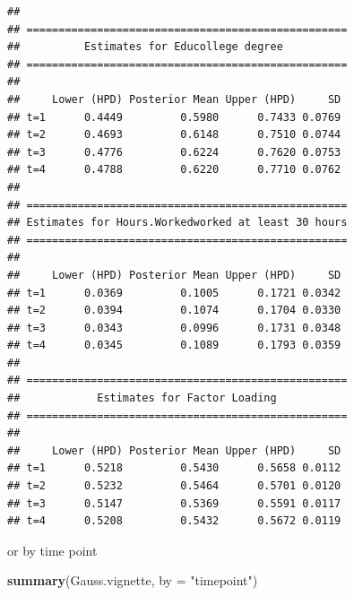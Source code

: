 \documentclass[a4paper, preprint, 3p,
authoryear]{elsarticle} %
\newenvironment{Shaded}{\begin{snugshade}}{\end{snugshade}}
\newcommand{\AttributeTok}[1]{\textcolor[rgb]{0.13,0.29,0.53}{#1}}
\newcommand{\FunctionTok}[1]{\textcolor[rgb]{0.13,0.29,0.53}{\textbf{#1}}}
\newcommand{\NormalTok}[1]{#1}
\newcommand{\StringTok}[1]{\textcolor[rgb]{0.31,0.60,0.02}{#1}}
\begin{document}
\begin{verbatim}
## 
## ==================================================
##          Estimates for Educollege degree
## ==================================================
## 
##     Lower (HPD) Posterior Mean Upper (HPD)     SD
## t=1      0.4449         0.5980      0.7433 0.0769
## t=2      0.4693         0.6148      0.7510 0.0744
## t=3      0.4776         0.6224      0.7620 0.0753
## t=4      0.4788         0.6220      0.7710 0.0762
## 
## ==================================================
## Estimates for Hours.Workedworked at least 30 hours
## ==================================================
## 
##     Lower (HPD) Posterior Mean Upper (HPD)     SD
## t=1      0.0369         0.1005      0.1721 0.0342
## t=2      0.0394         0.1074      0.1704 0.0330
## t=3      0.0343         0.0996      0.1731 0.0348
## t=4      0.0345         0.1089      0.1793 0.0359
## 
## ==================================================
##            Estimates for Factor Loading
## ==================================================
## 
##     Lower (HPD) Posterior Mean Upper (HPD)     SD
## t=1      0.5218         0.5430      0.5658 0.0112
## t=2      0.5232         0.5464      0.5701 0.0120
## t=3      0.5147         0.5369      0.5591 0.0117
## t=4      0.5208         0.5432      0.5672 0.0119
\end{verbatim}

or by time point

\begin{Shaded}
\begin{Highlighting}[]
\FunctionTok{summary}\NormalTok{(Gauss.vignette, }\AttributeTok{by =} \StringTok{"timepoint"}\NormalTok{)}
\end{Highlighting}
\end{Shaded}
\end{document}
